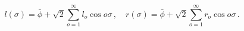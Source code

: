 \begin{equation}
l(\sigma )=\bar{\phi}+\sqrt{2}\sum_{o=1}^{\infty }l_{o}\cos o\sigma \,,\quad
r(\sigma )=\bar{\phi}+\sqrt{2}\sum_{o=1}^{\infty }r_{o}\cos o\sigma \,.
\end{equation}

